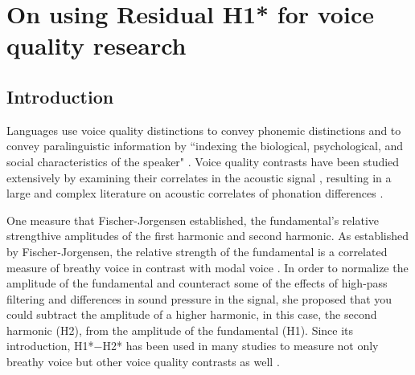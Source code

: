 
\chapter{On using Residual H1* for voice quality research} \label{ch:residual_h1}
\section{Introduction} \label{sec:Intro}

Languages use voice quality distinctions to convey phonemic distinctions \citep{garellekPhoneticsVoice2019} and to convey paralinguistic information by ``indexing the biological, psychological, and social characteristics of the speaker" \citep{laverVoiceQualityIndexical1968,podesvaStanceWindowLanguageRace2016}. Voice quality contrasts have been studied extensively by examining their correlates in the acoustic signal \citep[e.g.,][]{espositoCrosslinguisticPatternsPhonation2020}, resulting in a large and complex literature on acoustic correlates of phonation differences \citep[see][]{garellekPhoneticsVoice2019}. 

One measure that Fischer-Jorgensen established, the fundamental's relative strengthive amplitudes of the first harmonic and second harmonic. As established by Fischer-Jorgensen, the relative strength of the fundamental is a correlated measure of breathy voice in contrast with modal voice \citet{fischer-jorgensenPhoneticAnalysisBreathy1968}. In order to normalize the amplitude of the fundamental and counteract some of the effects of high-pass filtering and differences in sound pressure in the signal, she proposed that you could subtract the amplitude of a higher harmonic, in this case, the second harmonic (H2), from the amplitude of the fundamental (H1). Since its introduction, H1*$-$H2* has been used in many studies to measure not only breathy voice but other voice quality contrasts as well \citep{garellekPhoneticsVoice2019,chaiH1H2AcousticMeasure2022}.

